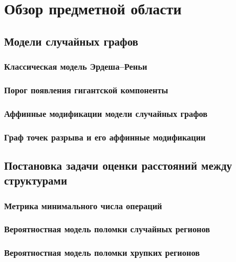 \chapter{Обзор предметной области}
\label{chap:overview}

\section{Модели случайных графов}
\label{sec:random_graph_models}

\subsection{Классическая модель Эрдеша–Реньи}
\label{subsec:erdos_renyi}

\subsection{Порог появления гигантской компоненты}
\label{subsec:giant_component_threshold}

\subsection{Аффинные модификации модели случайных графов}
\label{subsec:affine_modifications}

\subsection{Граф точек разрыва и его аффинные модификации}
\label{subsec:breakpoint_graph}

\section{Постановка задачи оценки расстояний между структурами}
\label{sec:distance_estimation}

\subsection{Метрика минимального числа операций}
\label{sec:minimal_operations}

\subsection{Вероятностная модель поломки случайных регионов}
\label{subsec:random_breakage}

\subsection{Вероятностная модель поломки хрупких регионов}
\label{subsec:fragile_breakage}

